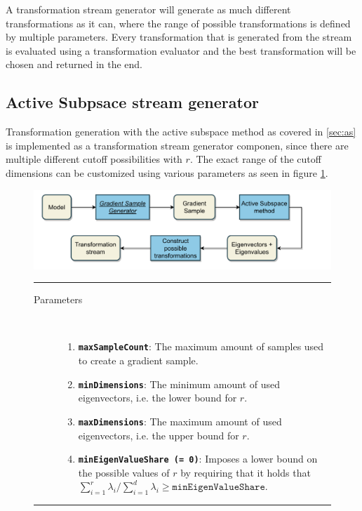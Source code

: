 \documentclass[
  a4paper,  %
  twoside,  %
  bibliography=totoc,
  headsepline,
  cleardoublepage=empty,
  parskip=half,
  draft=false
]{scrbook}
\newcommand{\delimit}{{\color{charcoal}\noindent\rule{\textwidth}{1pt}}}
\begin{document}
A transformation stream generator will generate as much different transformations as it can, where the range of possible transformations is defined by multiple parameters.
Every transformation that is generated from the stream is evaluated using a transformation evaluator and the best transformation will be chosen and returned in the end.

\newpage

\subsection{Active Subpsace stream generator}

Transformation generation with the active subspace method as covered in \ref{sec:as} is implemented as a transformation stream generator componen, since there are multiple different cutoff possibilities with $r$.
The exact range of the cutoff dimensions can be customized using various parameters as seen in figure \ref{fig:astsg}.

\begin{mdframed}[style=style,frametitle={Transformation stream generator (active subspaces)}]
\begin{figure}[H]
\vspace{5px}
\includegraphics[width=\textwidth]{graphics/TransformationStreamGen_AS.pdf}

\delimit

\begin{description}
\item[Parameters] {~ \begin{enumerate}[\indent{}]
\item \texttt{\textbf{maxSampleCount}}: The maximum amount of samples used to create a gradient sample.
\item \texttt{\textbf{minDimensions}}: The minimum amount of used eigenvectors, i.e. the lower bound for $r$.
\item \texttt{\textbf{maxDimensions}}: The maximum amount of used eigenvectors, i.e. the upper bound for $r$.
\item \texttt{\textbf{minEigenValueShare (= 0)}}: Imposes a lower bound on the possible values of $r$ by requiring that it holds that $\sum_{i=1}^r \lambda_i / \sum_{i=1}^d \lambda_i \geq \texttt{minEigenValueShare}$.
\end{enumerate}}
\end{description}
\delimit
{}
\label{fig:astsg}
\end{figure}
\end{mdframed}
\end{document}
